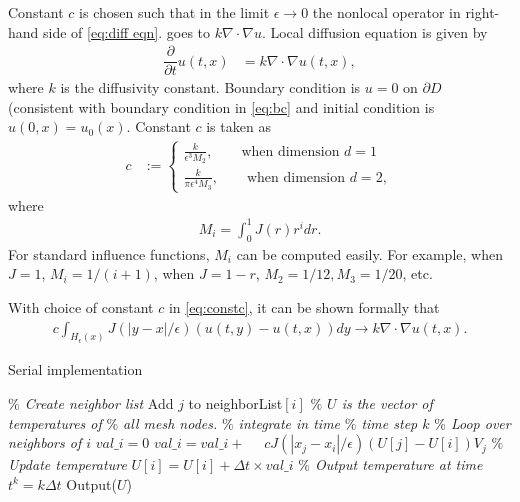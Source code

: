\documentclass[11pt,twocolumn]{amsart}
\theoremstyle{definition}
\theoremstyle{definition}
\numberwithin{equation}{section}
\numberwithin{equation}{section}
\begin{document}
Constant $c$ is chosen such that in the limit $\epsilon\to 0$ the nonlocal operator in right-hand side of \autoref{eq:diff eqn}. goes to $k\nabla \cdot \nabla u$. Local diffusion equation is given by
\begin{align}\label{eq:locdiff}
\dfrac{\partial }{\partial t} u(t,x) &= k \nabla \cdot \nabla u(t,x),
\end{align}
where $k$ is the diffusivity constant. Boundary condition is $u = 0$ on $\partial D$ (consistent with boundary condition in \autoref{eq:bc} and initial condition is $u(0,x) = u_0(x)$. Constant $c$ is taken as
\begin{align}\label{eq:constc}
c &:= \begin{cases}
\frac{k}{\epsilon^3 M_2}, \qquad \text{when dimension }d=1 \\
\frac{k}{\pi\epsilon^4 M_3}, \qquad \text{when dimension }d=2,
\end{cases}
\end{align}
where 
\begin{align}\label{eq:momentJ}
M_i = \int_0^1 J(r) r^i dr.
\end{align}
For standard influence functions, $M_i$ can be computed easily. For example, when $J = 1$, $M_i = 1/(i+1)$, when $J = 1- r$, $M_2 = 1/12, M_3 = 1/20$, etc.

With choice of constant $c$ in \autoref{eq:constc}, it can be shown formally that
\begin{align}\label{eq:limit}
c \int_{H_\epsilon(x)} J(|y-x|/\epsilon) (u(t,y) - u(t,x)) dy \to k \nabla \cdot \nabla u(t,x).
\end{align}

\begin{algorithm}[ht]
	\caption{Serial implementation}
	\label{alg:serial}
	\begin{algorithmic}[1]
		\STATE \textcolor{mygray}{\it $\%$ Create neighbor list}
				\STATE Add $j$ to neighborList$[i]$
			\ENDIF
		\ENDFOR
		\STATE
		\STATE \textcolor{mygray}{\it $\%$ $U$ is the vector of temperatures of}
		\STATE \textcolor{mygray}{\it $\%$ all mesh nodes.}
		\STATE
		\STATE \textcolor{mygray}{\it $\%$ integrate in time}
			\STATE \textcolor{mygray}{\it $\%$ time step $k$}
				\STATE \textcolor{mygray}{\it $\%$ Loop over neighbors of $i$}
				\STATE $val\_i = 0$
					\STATE $val\_i = val\_i + $					
					\STATE $\quad c J(|x_j - x_i|/\epsilon) (U[j] - U[i])V_j$
				\ENDFOR
				\STATE \textcolor{mygray}{\it $\%$ Update temperature}
				\STATE $U[i] = U[i] + \Delta t \times val\_i$
			\ENDFOR	
			\STATE \textcolor{mygray}{\it $\%$ Output temperature at time $t^k = k\Delta t$}
			\STATE Output($U$)
		\ENDFOR
	\end{algorithmic}
\end{algorithm}
\end{document}
